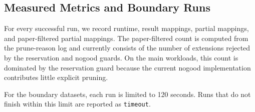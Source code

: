 \subsection{Measured Metrics and Boundary Runs}

For every successful run, we record runtime, result mappings, partial mappings, and paper-filtered partial mappings. The paper-filtered count is computed from the prune-reason log and currently consists of the number of extensions rejected by the reservation and nogood guards. On the main workloads, this count is dominated by the reservation guard because the current nogood implementation contributes little explicit pruning.

For the boundary datasets, each run is limited to 120 seconds. Runs that do not finish within this limit are reported as \texttt{timeout}.
